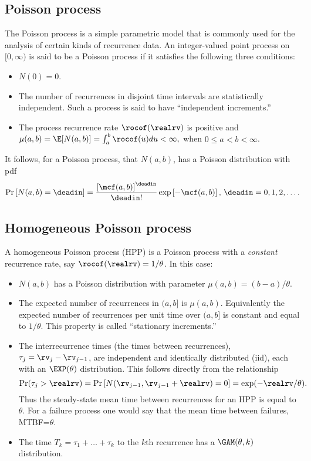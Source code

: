 \subsection{Poisson process}
The Poisson process is a simple parametric model that is commonly used 
for the analysis of certain kinds of recurrence data.
An integer-valued point process on $[0, \infty)$ is said to be
a Poisson process if it satisfies the following three conditions:
\begin{itemize} 
\item
$N(0)=0$.
\item
The number of recurrences in disjoint time intervals are
statistically independent. Such a process is said to have ``independent 
increments.''
\item
The process recurrence rate $\rocof(\realrv)$ is positive and 
$
\mu(a,b)=\E[N(a,b)]=\int_{a}^{b} \rocof(u) du< \infty,
$
when $0 \le a<b<\infty$.
\end{itemize}
It follows, for a Poisson process, that $N(a,b)$, has a Poisson
distribution with pdf
\begin{displaymath}
\Pr \left [N(a,b)=\deadin
    \right ]=\frac{\left [ \mcf(a,b) \right ]^{\deadin}}
                  {\deadin!}
	     \exp \left [-
\mcf(a,b)
		  \right ], \, \deadin=0,1,2, \dots .
\end{displaymath}

\subsection{Homogeneous Poisson process}
\label{section:hpp}
A homogeneous Poisson process (HPP) is a Poisson process
with a {\em constant} recurrence rate, say $\rocof(\realrv)=1/\theta$.
In this case: 
\begin{itemize} 
\item
$N(a,b)$ has a Poisson distribution with parameter 
$\mu(a,b)=(b-a)/\theta$.
\item
The expected number of recurrences in $(a,b]$ is $\mu(a,b)$.  Equivalently
the expected number of recurrences per unit time over $(a,b]$ is constant
and equal to $ 1/\theta$. This property is called ``stationary
increments.''
\item
The interrecurrence times (the times between recurrences),
$\tau_{j}=\rv_{j}-\rv_{j-1}$, are independent and identically
distributed (iid), each with an $\EXP(\theta)$ distribution.  This follows
directly from the relationship
\begin{displaymath}
\Pr ( \tau_{j} > \realrv )
=
\Pr \left [ N(\rv_{j-1},\rv_{j-1} + \realrv )=0
    \right ]=\exp(-\realrv/\theta).
\end{displaymath}
Thus the steady-state mean time between recurrences for an HPP is equal
to $\theta$. For a failure process one would say that
the mean time between failures, MTBF=$\theta$. 
\item
The time $T_{k}=\tau_{1} + \dots + \tau_{k}$ to the $k$th 
recurrence has a $\GAM(\theta,k)$ distribution.
\end{itemize}

